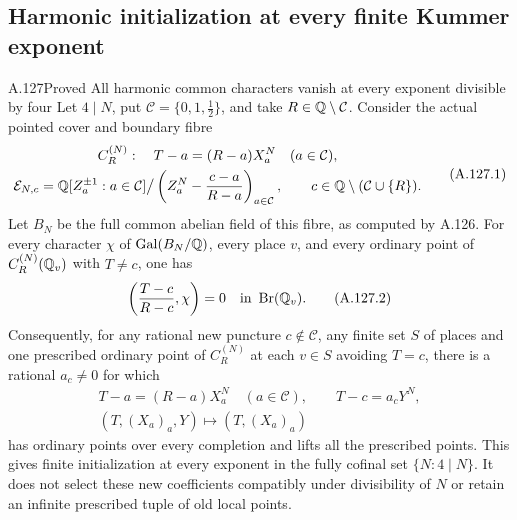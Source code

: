 \subsection{Harmonic initialization at every finite Kummer exponent}

\begin{statement}{A.127}{Proved}
{All harmonic common characters vanish at every exponent divisible by four}
Let $4\mid N$, put $\mathcal C=\{0,1,\tfrac12\}$,
and take $R\in\mathbb Q\setminus\mathcal C$.
Consider the actual pointed cover and boundary fibre
\[
 \begin{gathered}
 C_R^{(N)}:\quad T-a=(R-a)X_a^N\quad(a\in\mathcal C),\\
 \mathcal E_{N,c}
   =\mathbb Q[Z_a^{\pm1}:a\in\mathcal C]
       \big/\left(Z_a^N-\frac{c-a}{R-a}\right)_{a\in\mathcal C},
 \qquad c\in\mathbb Q\setminus(\mathcal C\cup\{R\}).
 \end{gathered}
\tag{A.127.1}
\]
Let $B_N$ be the full common abelian field of this
fibre, as computed by A.126.
For every character $\chi$ of $\operatorname{Gal}(B_N/\mathbb Q)$,
every place $v$, and every ordinary point of
$C_R^{(N)}(\mathbb Q_v)$ with $T\ne c$, one has
\[
                  \left(\frac{T-c}{R-c},\chi\right)=0
                                      \quad\text{in }\operatorname{Br}(\mathbb Q_v).
\tag{A.127.2}
\]
Consequently, for any rational new puncture
$c\notin\mathcal C$, any finite set $S$ of places
and one prescribed ordinary point of $C_R^{(N)}$
at each $v\in S$ avoiding $T=c$, there is a rational
$a_c\ne0$ for which
\[
 \begin{gathered}
 T-a=(R-a)X_a^N\quad(a\in\mathcal C),\qquad
 T-c=a_cY^N,\\
          (T,(X_a)_a,Y)\longmapsto(T,(X_a)_a)
 \end{gathered}
\tag{A.127.3}
\]
has ordinary points over every completion and
lifts all the prescribed points.
This gives finite initialization at every exponent
in the fully cofinal set $\{N:4\mid N\}$.
It does not select these new coefficients compatibly
under divisibility of $N$ or retain an infinite
prescribed tuple of old local points.
\end{statement}
